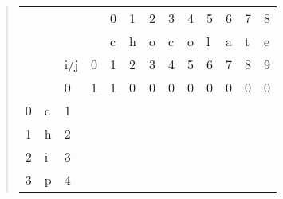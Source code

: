 \begin{quote}
    \begin{table}[H]
        \centering
        \begin{tabular}{lllllllllllll}
            &   &                        &                        & 0                      & 1                      & 2                      & 3                      & 4                      & 5                      & 6                      & 7                      & 8                      \\
            &   &                        &                        & c                      & h                      & o                      & c                      & o                      & l                      & a                      & t                      & e                      \\
            &   & i/j                    & 0                      & 1                      & 2                      & 3                      & 4                      & 5                      & 6                      & 7                      & 8                      & 9                      \\ \cline{4-13} 
            &   & \multicolumn{1}{l|}{0} & \multicolumn{1}{l|}{1} & \multicolumn{1}{l|}{1} & \multicolumn{1}{l|}{0} & \multicolumn{1}{l|}{0} & \multicolumn{1}{l|}{0} & \multicolumn{1}{l|}{0} & \multicolumn{1}{l|}{0} & \multicolumn{1}{l|}{0} & \multicolumn{1}{l|}{0} & \multicolumn{1}{l|}{0} \\ \cline{4-13} 
          0 & c & \multicolumn{1}{l|}{1} & \multicolumn{1}{l|}{}  & \multicolumn{1}{l|}{}  & \multicolumn{1}{l|}{}  & \multicolumn{1}{l|}{}  & \multicolumn{1}{l|}{}  & \multicolumn{1}{l|}{}  & \multicolumn{1}{l|}{}  & \multicolumn{1}{l|}{}  & \multicolumn{1}{l|}{}  & \multicolumn{1}{l|}{}  \\ \cline{4-13} 
          1 & h & \multicolumn{1}{l|}{2} & \multicolumn{1}{l|}{}  & \multicolumn{1}{l|}{}  & \multicolumn{1}{l|}{}  & \multicolumn{1}{l|}{}  & \multicolumn{1}{l|}{}  & \multicolumn{1}{l|}{}  & \multicolumn{1}{l|}{}  & \multicolumn{1}{l|}{}  & \multicolumn{1}{l|}{}  & \multicolumn{1}{l|}{}  \\ \cline{4-13} 
          2 & i & \multicolumn{1}{l|}{3} & \multicolumn{1}{l|}{}  & \multicolumn{1}{l|}{}  & \multicolumn{1}{l|}{}  & \multicolumn{1}{l|}{}  & \multicolumn{1}{l|}{}  & \multicolumn{1}{l|}{}  & \multicolumn{1}{l|}{}  & \multicolumn{1}{l|}{}  & \multicolumn{1}{l|}{}  & \multicolumn{1}{l|}{}  \\ \cline{4-13} 
          3 & p & \multicolumn{1}{l|}{4} & \multicolumn{1}{l|}{}  & \multicolumn{1}{l|}{}  & \multicolumn{1}{l|}{}  & \multicolumn{1}{l|}{}  & \multicolumn{1}{l|}{}  & \multicolumn{1}{l|}{}  & \multicolumn{1}{l|}{}  & \multicolumn{1}{l|}{}  & \multicolumn{1}{l|}{}  & \multicolumn{1}{l|}{}  \\ \cline{4-13} 

\end{tabular}
\end{table}
\end{quote}
